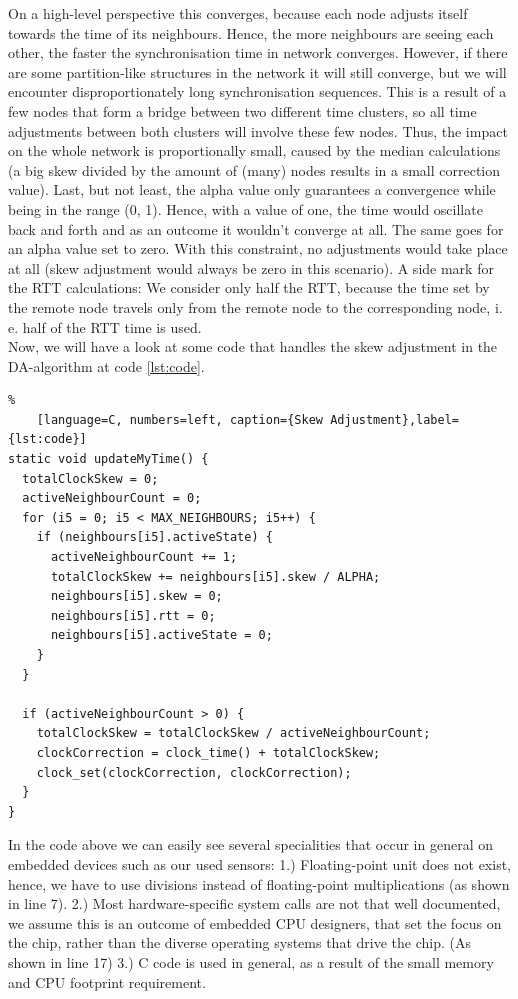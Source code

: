 \documentclass{llncs}
\begin{document}
\noindent On a high-level perspective this converges, because each node adjusts itself towards the time of its neighbours. Hence, the more neighbours are seeing each other, the faster the synchronisation time in network converges. However, if there are some partition-like structures in the network it will still converge, but we will encounter disproportionately long synchronisation sequences. This is a result of a few nodes that form a bridge between two different time clusters, so all time adjustments between both clusters will involve these few nodes. Thus, the impact on the whole network is proportionally small, caused by the median calculations (a big skew divided by the amount of (many) nodes results in a small correction value). Last, but not least, the alpha value only guarantees a convergence while being in the range (0, 1). Hence, with a value of one, the time would oscillate back and forth and as an outcome it wouldn't converge at all. The same goes for an alpha value set to zero. With this constraint, no adjustments would take place at all (skew adjustment would always be zero in this scenario).
\bigbreak
\noindent A side mark for the RTT calculations: We consider only half the RTT, because the time set by the remote node travels only from the remote node to the corresponding node, i. e. half of the RTT time is used.\\
Now, we will have a look at some code that handles the skew adjustment in the DA-algorithm at code \ref{lst:code}.

\begin{lstlisting}%
	[language=C, numbers=left, caption={Skew Adjustment},label={lst:code}]
static void updateMyTime() {
  totalClockSkew = 0;
  activeNeighbourCount = 0;
  for (i5 = 0; i5 < MAX_NEIGHBOURS; i5++) {
    if (neighbours[i5].activeState) {
      activeNeighbourCount += 1;
      totalClockSkew += neighbours[i5].skew / ALPHA;
      neighbours[i5].skew = 0;
      neighbours[i5].rtt = 0;
      neighbours[i5].activeState = 0;
    }
  }

  if (activeNeighbourCount > 0) {
    totalClockSkew = totalClockSkew / activeNeighbourCount;
    clockCorrection = clock_time() + totalClockSkew;
    clock_set(clockCorrection, clockCorrection);
  }
}
\end{lstlisting}
\noindent In the code above we can easily see several specialities that occur in general on embedded devices such as our used sensors: 1.) Floating-point unit does not exist, hence, we have to use divisions instead of floating-point multiplications (as shown in line 7). 2.) Most hardware-specific system calls are not that well documented, we assume this is an outcome of embedded CPU designers, that set the focus on the chip, rather than the diverse operating systems that drive the chip. (As shown in line 17) 3.) C code is used in general, as a result of the small memory and CPU footprint requirement.
\end{document}
